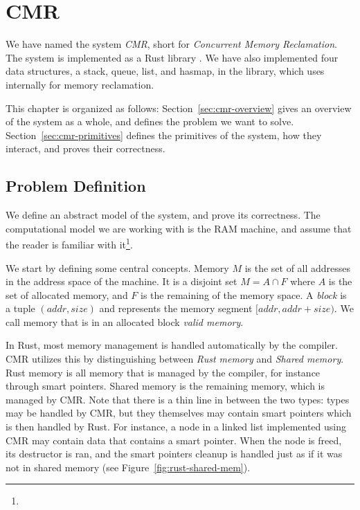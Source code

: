 \chapter{CMR}

We have named the system \emph{CMR}, short for \emph{Concurrent Memory Reclamation}. The system is
implemented as a Rust library . We have also implemented four data structures, a stack,
queue, list, and hasmap, in the  library, which uses 
internally for memory reclamation.

This chapter is organized as follows:
Section~\ref{sec:cmr-overview} gives an overview of the system as a whole, and defines the problem
we want to solve.
Section~\ref{sec:cmr-primitives} defines the primitives of the system, how they interact, and
proves their correctness.

\section{Problem Definition}

We define an abstract model of the system, and prove its correctness.
The computational model we are working with is the RAM machine, and assume that
the reader is familiar with it\footnote{}.

We start by defining some central concepts.
Memory $M$ is the set of all addresses in the address space of the machine.
It is a disjoint set $M = A \cap F$ where $A$ is the set of allocated memory, and $F$ is the
remaining of the memory space.
A \emph{block} is a tuple $(addr, size)$ and represents the memory segment $[addr, addr + size)$.
We call memory that is in an allocated block \emph{valid memory}.

In Rust, most memory management is handled automatically by the compiler. CMR utilizes this by
distinguishing between \emph{Rust memory} and \emph{Shared memory}. Rust memory is all memory that
is managed by the compiler, for instance through smart pointers. Shared memory is the remaining
memory, which is managed by CMR\@. Note that there is a thin line in between the two types: types may
be handled by CMR, but they themselves may contain smart pointers which is then handled by Rust.
For instance, a node in a linked list implemented using CMR may contain data that contains a smart
pointer. When the node is freed, its destructor is ran, and the smart pointers cleanup is handled
just as if it was not in shared memory (see Figure~\ref{fig:rust-shared-mem}).

